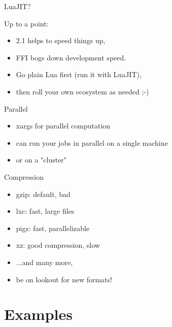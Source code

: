 \documentclass[handout]{beamer}
\begin{document}

\begin{frame}{LuaJIT?}

Up to a point:
\begin{itemize}
\item 2.1 helps to speed things up,
\item FFI bogs down development speed.
\item Go plain Lua first (run it with LuaJIT),
\item then roll your own ecosystem as needed ;-)
\end{itemize}

\end{frame}


\begin{frame}{Parallel}

\begin{itemize}
\item xargs for parallel computation
\item can run your jobs in parallel on a single machine
\item or on a "cluster"
\end{itemize}

\end{frame}


\begin{frame}{Compression}

\begin{itemize}
\item gzip: default, bad
\item lxc: fast, large files
\item pigz: fast, parallelizable
\item xz: good compression, slow
\item ...and many more,
\item be on lookout for new formats!
\end{itemize}

\end{frame}


\section{Examples}
\end{document}
